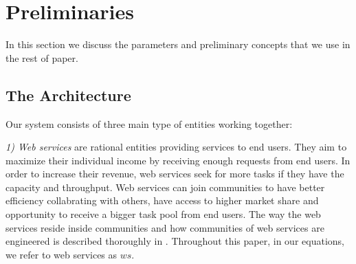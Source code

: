 \documentclass[10pt, conference, compsocconf]{IEEEtran}
\theoremstyle{plain}
\theoremstyle{definition}
\begin{document}
%
%

\section{Preliminaries}\label{s:preliminaries}

In this section we discuss the parameters and preliminary concepts that we use in the rest of paper. 

\subsection{The Architecture}

Our system consists of three main type of entities working together:


\emph{1) Web services} are rational entities providing services to end users. They aim to maximize their individual income by receiving enough requests from end users. In order to increase their revenue, web services seek for more tasks if they have the capacity and throughput. Web services can join communities to have better efficiency collabrating with others, have access to higher market share and opportunity to receive a bigger task pool from end users. The way the web services reside inside communities and how communities of web services are engineered is described thoroughly in \cite{DBLP:journals/ijebr/MaamarSTBB09}. Throughout this paper, in our equations, we refer to web services as $ws$.
\end{document}
